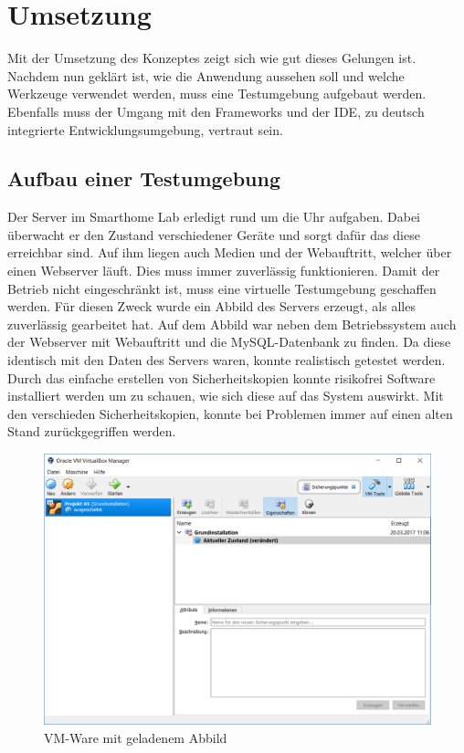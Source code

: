 \chapter{Umsetzung}
Mit der Umsetzung des Konzeptes zeigt sich wie gut dieses Gelungen ist. Nachdem nun geklärt ist, wie die Anwendung aussehen soll und welche Werkzeuge verwendet werden, muss eine Testumgebung aufgebaut werden. Ebenfalls muss der Umgang mit den Frameworks und der \ac{IDE}, zu deutsch integrierte Entwicklungsumgebung, vertraut sein.

\section{Aufbau einer Testumgebung}
\label{sec:integration_ace}
Der Server im Smarthome Lab erledigt rund um die Uhr aufgaben. Dabei überwacht er den Zustand verschiedener Geräte und sorgt dafür das diese erreichbar sind. Auf ihm liegen auch Medien und der Webauftritt, welcher über einen Webserver läuft. Dies muss immer zuverlässig funktionieren. Damit der Betrieb nicht eingeschränkt ist, muss eine virtuelle Testumgebung geschaffen werden. Für diesen Zweck wurde ein Abbild des Servers erzeugt, als alles zuverlässig gearbeitet hat. Auf dem Abbild war neben dem Betriebssystem auch der Webserver mit Webauftritt und die MySQL-Datenbank zu finden. Da diese identisch mit den Daten des Servers waren, konnte realistisch getestet werden. Durch das einfache erstellen von Sicherheitskopien konnte risikofrei Software installiert werden um zu schauen, wie sich diese auf das System auswirkt. Mit den verschieden Sicherheitskopien, konnte bei Problemen immer auf einen alten Stand zurückgegriffen werden.


\begin{figure}[bh]
	\centering
	\includegraphics[scale=0.4]{content/pictures/vmware.png}
	\caption{VM-Ware mit geladenem Abbild}
	\label{fig:vmware}
\end{figure}

